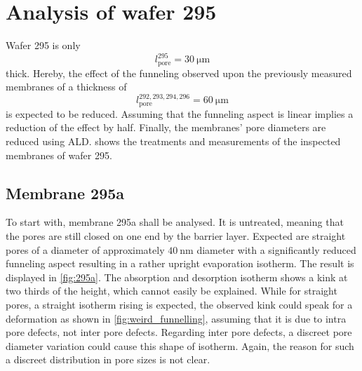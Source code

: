 \documentclass[thesis.tex]{subfiles}
\begin{document}
    \section{Analysis of wafer 295}
    \label{sec:wafer295}

        Wafer 295 is only
        \begin{equation}
            l^{295}_\mathrm{pore}=\SI{30}{\micro\meter}
        \end{equation}
        thick. Hereby, the effect of the funneling observed upon the previously measured membranes of a thickness of
        \begin{equation}
            l^{292,293,294,296}_\mathrm{pore}=\SI{60}{\micro\meter}
        \end{equation}
        is expected to be reduced. Assuming that the funneling aspect is linear implies a reduction of the effect by half.
        Finally, the membranes' pore diameters are reduced using ALD.  shows the treatments and measurements of the inspected membranes of wafer 295.

        


        \subsection{Membrane 295a}

            

            To start with, membrane 295a shall be analysed. It is untreated, meaning that the pores are still closed on one end by the barrier layer. Expected are straight pores of a diameter of approximately
            $\SI{40}{\nano\meter}$ diameter with a significantly reduced funneling aspect resulting in a rather upright evaporation isotherm. The result is displayed in \cref{fig:295a}. The absorption and desorption isotherm shows a kink at two thirds of the height, which cannot easily be explained. While for straight pores, a straight isotherm rising is expected, the observed kink could speak for a deformation as shown in \cref{fig:weird_funnelling}, assuming that it is due to intra pore defects, not inter pore defects. Regarding inter pore defects, a discreet pore diameter variation could cause this shape of isotherm. Again, the reason for such a discreet distribution in pore sizes is not clear.

            
\end{document}
